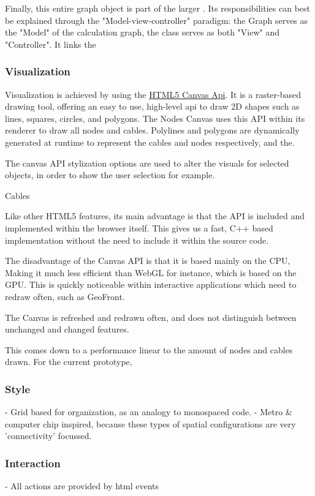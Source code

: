 Finally, this entire graph object is part of the larger . 
Its responsibilities can best be explained through the "Model-view-controller" paradigm: the Graph serves as the "Model" of the calculation graph, the  class serves as both "View" and "Controller". It links the 


\subsubsection*{Visualization}
Visualization is achieved by using the \href{https://developer.mozilla.org/en-US/docs/Web/API/Canvas_API}{HTML5 Canvas Api}. 
It is a raster-based drawing tool, offering an easy to use, high-level api to draw 2D shapes such as lines, squares, circles, and polygons. 
The Nodes Canvas uses this API within its renderer to draw all nodes and cables. 
Polylines and polygons are dynamically generated at runtime to represent the cables and nodes respectively, and the.  

The canvas API stylization options are used to alter the visuals for selected objects, in order to show the user selection for example. 

Cables

Like other HTML5 features, its main advantage is that the API is included and implemented within the browser itself. This gives us a fast, C++ based implementation without the need to include it within the source code.

The disadvantage  of the Canvas API is that it is based mainly on the CPU, Making it much less efficient than WebGL for instance, which is based on the GPU. 
This is quickly noticeable within interactive applications which need to redraw often, such as GeoFront. 

The Canvas is refreshed and redrawn often, and does not distinguish between unchanged and changed features. 

This comes down to a performance linear to the amount of nodes and cables drawn. For the current prototype, 


\subsubsection*{Style}
- Grid based for organization, as an analogy to monospaced code.
- Metro \& computer chip inspired, because these types of spatial configurations are very 'connectivity' focussed.

\subsubsection{Interaction}
- All actions are provided by html events 

